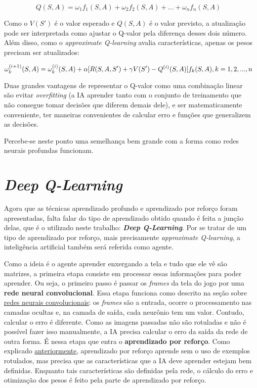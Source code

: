 \begin{equation} \label{eq:q_lin_comb}
Q(S,A) = \omega_{1}f_{1}(S,A) + \omega_{2}f_{2}(S,A) + ... + \omega_{n}f_{n}(S,A)
\end{equation}

Como o $V(S')$ é o valor esperado e $Q(S,A)$ é o valor previsto, a atualização pode ser interpretada como ajustar o Q-valor pela diferença desses dois número. Além disso, como o \textit{approximate Q-learning} avalia características, apenas os pesos precisam ser atualizados:

\begin{equation} \label{eq:w_update}
\omega_{k}^{(i+1)}(S,A) = \omega_{k}^{(i)}(S,A) + \alpha[R(S,A,S') + \gamma V(S') - Q^{(i)}(S,A)]f_{k}(S,A), \hfill k = 1, 2, ..., n
\end{equation}

Duas grandes vantagens de representar o Q-valor como uma combinação linear são evitar \textit{overfitting} (a IA aprender tanto com o conjunto de treinamento que não consegue tomar decisões que diferem demais dele), e ser matematicamente conveniente, ter maneiras convenientes de calcular erro e funções que generalizem as decisões.

Percebe-se neste ponto uma semelhança bem grande com a forma como redes neurais profundas funcionam.


\section{\textit{Deep Q-Learning}}
\label{sec:dql}

Agora que as técnicas aprendizado profundo e aprendizado por reforço foram apresentadas, falta falar do tipo de aprendizado obtido quando é feita a junção delas, que é o utilizado neste trabalho: \textit{\textbf{Deep Q-Learning}}.
Por se tratar de um tipo de aprendizado por reforço, mais precisamente \textit{approximate Q-learning}, a inteligência artificial também será referida como agente.

Como a ideia é o agente aprender enxergando a tela e tudo que ele vê são matrizes, a primeira etapa consiste em processar essas informações para poder aprender.
Ou seja, o primeiro passo é passar os \textit{frames} da tela do jogo por uma \textbf{rede neural convolucional}.
Essa etapa funciona como descrito na seção sobre \hyperref[sec:cnn]{redes neurais convolucionais}: os \textit{frames} são a entrada, ocorre o processamento nas camadas ocultas e, na camada de saída, cada neurônio tem um valor.
Contudo, calcular o erro é diferente.
Como as imagens passadas não são rotuladas e não é possível fazer isso manualmente, a IA precisa calcular o erro da saída da rede de outra forma.
É nessa etapa que entra o \textbf{aprendizado por reforço}.
Como explicado \hyperref[sec:rl]{anteriormente}, aprendizado por reforço aprende sem o uso de exemplos rotulados, mas precisa que as características que a IA deve aprender estejam bem definidas.
Enquanto tais características são definidas pela rede, o cálculo do erro e otimização dos pesos é feito pela parte de aprendizado por reforço.

